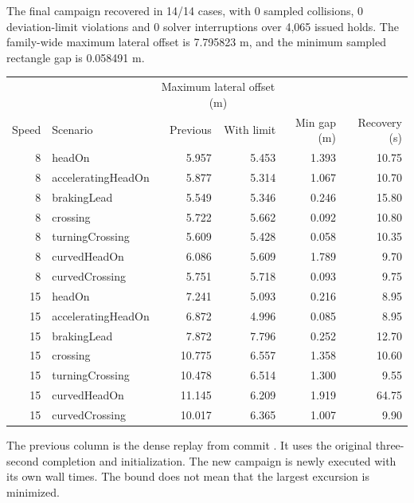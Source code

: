 \documentclass[10pt]{article}
\begin{document}
The final campaign recovered in 14/14 cases, with 0 sampled collisions, 0 deviation-limit violations and 0 solver interruptions over 4,065 issued holds. The family-wide maximum lateral offset is 7.795823 m, and the minimum sampled rectangle gap is 0.058491 m.
\begin{center}\small\begin{tabular}{rlrrrr}\toprule
 & & \multicolumn{2}{c}{Maximum lateral offset (m)} & & \\
Speed & Scenario & Previous & With limit & Min gap (m) & Recovery (s)\\\midrule
8 & headOn & 5.957 & 5.453 & 1.393 & 10.75 \\
8 & acceleratingHeadOn & 5.877 & 5.314 & 1.067 & 10.70 \\
8 & brakingLead & 5.549 & 5.346 & 0.246 & 15.80 \\
8 & crossing & 5.722 & 5.662 & 0.092 & 10.80 \\
8 & turningCrossing & 5.609 & 5.428 & 0.058 & 10.35 \\
8 & curvedHeadOn & 6.086 & 5.609 & 1.789 & 9.70 \\
8 & curvedCrossing & 5.751 & 5.718 & 0.093 & 9.75 \\
15 & headOn & 7.241 & 5.093 & 0.216 & 8.95 \\
15 & acceleratingHeadOn & 6.872 & 4.996 & 0.085 & 8.95 \\
15 & brakingLead & 7.872 & 7.796 & 0.252 & 12.70 \\
15 & crossing & 10.775 & 6.557 & 1.358 & 10.60 \\
15 & turningCrossing & 10.478 & 6.514 & 1.300 & 9.55 \\
15 & curvedHeadOn & 11.145 & 6.209 & 1.919 & 64.75 \\
15 & curvedCrossing & 10.017 & 6.365 & 1.007 & 9.90 \\
\bottomrule\end{tabular}\end{center}
The previous column is the dense replay from commit
. It uses the original three-second
completion and initialization. The new campaign is newly executed with its own
wall times. The bound does not mean that the largest excursion is minimized.
\end{document}
